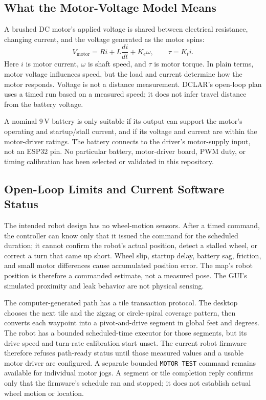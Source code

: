\documentclass{article}
\begin{document}
\subsection{What the Motor-Voltage Model Means}

A brushed DC motor's applied voltage is shared between electrical resistance, changing current, and the voltage generated as the motor spins:
\[
V_{\mathrm{motor}}=Ri+L\frac{di}{dt}+K_e\omega,\qquad \tau=K_ti.
\]
Here $i$ is motor current, $\omega$ is shaft speed, and $\tau$ is motor torque. In plain terms, motor voltage influences speed, but the load and current determine how the motor responds. Voltage is not a distance measurement. DCLAR's open-loop plan uses a timed run based on a measured speed; it does not infer travel distance from the battery voltage.

A nominal $9\,\mathrm{V}$ battery is only suitable if its output can support the motor's operating and startup/stall current, and if its voltage and current are within the motor-driver ratings. The battery connects to the driver's motor-supply input, not an ESP32 pin. No particular battery, motor-driver board, PWM duty, or timing calibration has been selected or validated in this repository.

\subsection{Open-Loop Limits and Current Software Status}

The intended robot design has no wheel-motion sensors. After a timed command, the controller can know only that it issued the command for the scheduled duration; it cannot confirm the robot's actual position, detect a stalled wheel, or correct a turn that came up short. Wheel slip, startup delay, battery sag, friction, and small motor differences cause accumulated position error. The map's robot position is therefore a commanded estimate, not a measured pose. The GUI's simulated proximity and leak behavior are not physical sensing.

The computer-generated path has a tile transaction protocol. The desktop chooses the next tile and the zigzag or circle-spiral coverage pattern, then converts each waypoint into a pivot-and-drive segment in global feet and degrees. The robot has a bounded scheduled-time executor for those segments, but its drive speed and turn-rate calibration start unset. The current robot firmware therefore refuses path-ready status until those measured values and a usable motor driver are configured. A separate bounded \texttt{MOTOR\_TEST} command remains available for individual motor jogs. A segment or tile completion reply confirms only that the firmware's schedule ran and stopped; it does not establish actual wheel motion or location.
\end{document}
